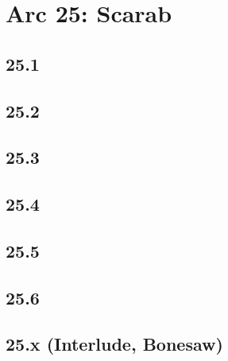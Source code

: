 \part{Arc 25: Scarab}
 \chapter{25.1}
 \chapter{25.2}
 \chapter{25.3}
 \chapter{25.4}
 \chapter{25.5}
 \chapter{25.6}
 \chapter{25.x (Interlude, Bonesaw)}








